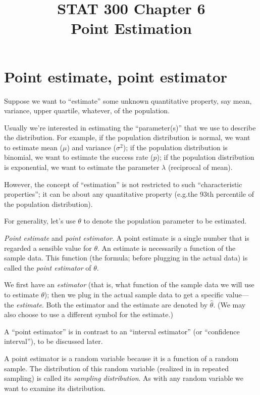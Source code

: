 \documentclass[12pt]{article}
\begin{document}
\title{STAT 300 Chapter 6\\ Point Estimation}
\maketitle

\section{Point estimate, point estimator}

Suppose we want to ``estimate'' some unknown
quantitative property,
say mean, variance, upper quartile, whatever,
of the population.

Usually we're interested in estimating the
``parameter(s)'' that we use to describe the distribution.
For example,
if the population distribution is normal, we want to estimate
mean ($\mu$) and variance ($\sigma^2$);
if the population distribution is binomial, we want to estimate
the success rate ($p$);
if the population distribution is exponential, we want to estimate
the parameter $\lambda$ (reciprocal of mean).

However, the concept of ``estimation'' is not restricted to such
``characteristic properties''; it can be about any quantitative property
(e.g.\@ the 93th percentile of the population distribution).

For generality, let's use $\theta$ to denote the population parameter to
be estimated.

\alert[Definition]%
\emph{Point estimate} and \emph{point estimator}.
A point estimate is a single number that is regarded a sensible value
for $\theta$.
An estimate is necessarily a function of the sample data.
This function (the formula; before plugging in the actual data) is
called the \emph{point estimator} of $\theta$.

We first have an \emph{estimator} (that is, what function of the sample data we
will use to estimate $\theta$);
then we plug in the actual sample data to get a specific value---the
\emph{estimate}.
Both the estimator and the estimate are denoted by $\hat{\theta}$.
(We may also choose to use a different symbol for the estimate.)

\alert A ``point estimator'' is in contrast to an ``interval estimator''
(or ``confidence interval''), to be discussed later.

A point estimator is a random variable because it is a function of a random sample.
The distribution of this random variable
(realized in in repeated sampling) is called its \emph{sampling distribution}.
As with any random variable we want to examine its distribution.
\end{document}
